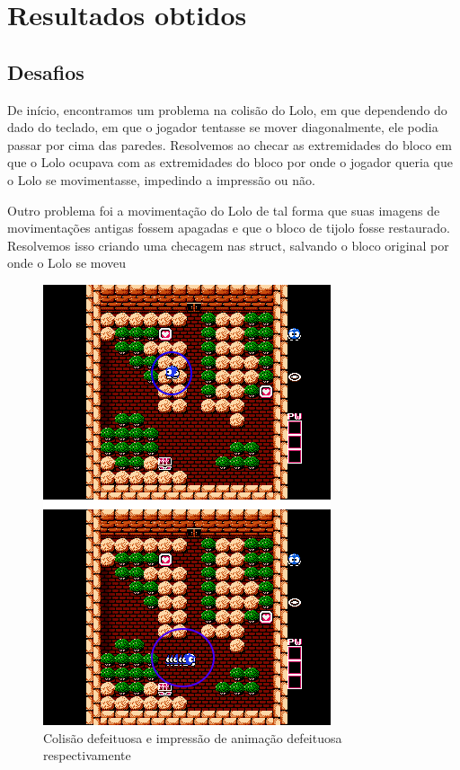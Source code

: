 \documentclass[10pt, conference, compsocconf]{IEEEtran}
\begin{document}
\section{Resultados obtidos}
\label{sec:Resultados}

\subsection{Desafios}{
De início, encontramos um problema na colisão do
Lolo, em que dependendo do dado do teclado, em que
o jogador tentasse se mover diagonalmente, ele podia
passar por cima das paredes. Resolvemos ao checar
as extremidades do bloco em que o Lolo ocupava com
as extremidades do bloco por onde o jogador queria
que o Lolo se movimentasse, impedindo a impressão
ou não.

Outro problema foi a movimentação do Lolo de tal forma que suas imagens de
movimentações antigas fossem apagadas e que o bloco de tijolo fosse restaurado.
Resolvemos isso criando uma checagem nas struct, salvando o bloco original por
onde o Lolo se moveu }

\begin{figure}[htb]
  \begin{center}
   \includegraphics[width=0.9\linewidth]{./Figures/image_newest.png}
  \end{center}
  \caption{Colisão defeituosa e impressão
de animação defeituosa respectivamente}
\end{figure}
\end{document}
